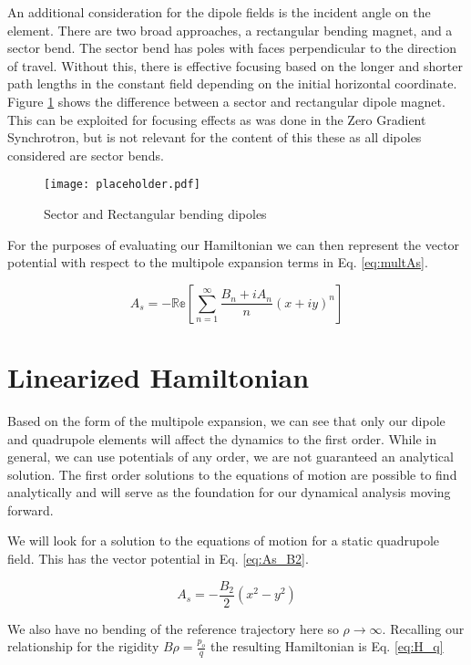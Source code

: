 An additional consideration for the dipole fields is the incident angle on the element. There are two broad approaches, a rectangular bending magnet, and a sector bend. The sector bend has poles with faces perpendicular to the direction of travel. Without this, there is effective focusing based on the longer and shorter path lengths in the constant field depending on the initial horizontal coordinate. Figure \ref{fig:sector} shows the difference between a sector and rectangular dipole magnet. This can be exploited for focusing effects as was done in the Zero Gradient Synchrotron, but is not relevant for the content of this these as all dipoles considered are sector bends.

\begin{figure} \label{fig:sector}
	\centering
	\texttt{[image: placeholder.pdf]}
	\caption{Sector and Rectangular bending dipoles}
\end{figure}


For the purposes of evaluating our Hamiltonian we can then represent the vector potential with respect to the multipole expansion terms in Eq. \ref{eq:multAs}.

\begin{equation} \label{eq:multAs}
	A_s  =  - \mathbb{Re} \left[ \sum_{n=1}^{\infty} \frac{B_n + i A_n}{n} (x+iy)^n \right]
\end{equation}


\section{Linearized Hamiltonian} \label{sec:linHam}
Based on the form of the multipole expansion, we can see that only our dipole and quadrupole elements will affect the dynamics to the first order. While in general, we can use potentials of any order, we are not guaranteed an analytical solution. The first order solutions to the equations of motion are possible to find analytically and will serve as the foundation for our dynamical analysis moving forward.

We will look for a solution to the equations of motion for a static quadrupole field. This has the vector potential in Eq. \ref{eq:As_B2}.

\begin{equation} \label{eq:As_B2}
	A_s = -\frac{B_2}{2}(x^2 - y^2)
\end{equation}

We also have no bending of the reference trajectory here so $\rho \rightarrow \infty$. Recalling our relationship for the rigidity $B\rho = \frac{p_o}{q}$ the resulting Hamiltonian is Eq. \ref{eq:H_q}

